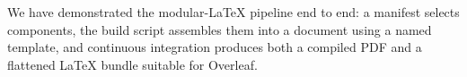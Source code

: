 We have demonstrated the modular-LaTeX pipeline end to end: a manifest
selects components, the build script assembles them into a document
using a named template, and continuous integration produces both a
compiled PDF and a flattened \LaTeX{} bundle suitable for Overleaf.
